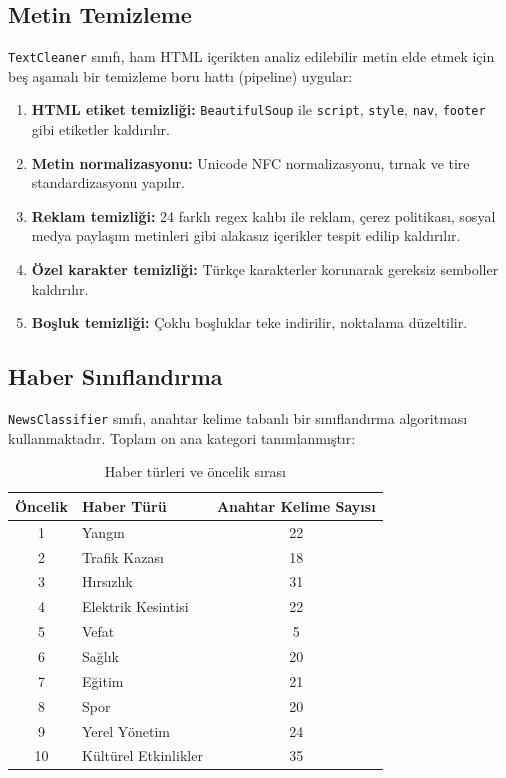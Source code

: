 \documentclass[conference]{IEEEtran}
\begin{document}
\subsection{Metin Temizleme}

\texttt{TextCleaner} sınıfı, ham HTML içerikten analiz edilebilir metin elde etmek için beş aşamalı bir temizleme boru hattı (pipeline) uygular:

\begin{enumerate}
    \item \textbf{HTML etiket temizliği:} \texttt{BeautifulSoup} ile \texttt{script}, \texttt{style}, \texttt{nav}, \texttt{footer} gibi etiketler kaldırılır.
    \item \textbf{Metin normalizasyonu:} Unicode NFC normalizasyonu, tırnak ve tire standardizasyonu yapılır.
    \item \textbf{Reklam temizliği:} 24 farklı regex kalıbı ile reklam, çerez politikası, sosyal medya paylaşım metinleri gibi alakasız içerikler tespit edilip kaldırılır.
    \item \textbf{Özel karakter temizliği:} Türkçe karakterler korunarak gereksiz semboller kaldırılır.
    \item \textbf{Boşluk temizliği:} Çoklu boşluklar teke indirilir, noktalama düzeltilir.
\end{enumerate}

\subsection{Haber Sınıflandırma}

\texttt{NewsClassifier} sınıfı, anahtar kelime tabanlı bir sınıflandırma algoritması kullanmaktadır. Toplam on ana kategori tanımlanmıştır:

\begin{table}[H]
    \centering
    \caption{Haber türleri ve öncelik sırası}
    \label{tab:haber_turleri}
    \begin{tabular}{|c|l|c|}
        \hline
        \textbf{Öncelik} & \textbf{Haber Türü} & \textbf{Anahtar Kelime Sayısı} \\
        \hline
        1 & Yangın & 22 \\
        2 & Trafik Kazası & 18 \\
        3 & Hırsızlık & 31 \\
        4 & Elektrik Kesintisi & 22 \\
        5 & Vefat & 5 \\
        6 & Sağlık & 20 \\
        7 & Eğitim & 21 \\
        8 & Spor & 20 \\
        9 & Yerel Yönetim & 24 \\
        10 & Kültürel Etkinlikler & 35 \\
        \hline
    \end{tabular}
\end{table}
\end{document}
